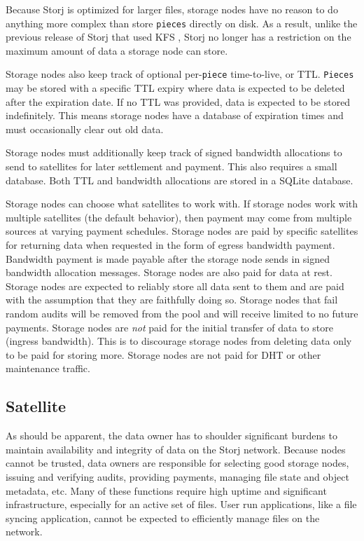 \documentclass[a4paper,10pt]{article} \usepackage[utf8]{inputenc}
\newcommand{\x}[1]{{\tt #1}} \newcommand{\code}[1]{{\tt #1}}
\begin{document}
Because Storj is optimized for larger files, storage nodes have no reason to do
anything more complex than store \x{pieces} directly on disk. As a result,
unlike the previous release of Storj that used KFS \cite{storj-v2}, Storj no
longer has a restriction on the maximum amount of data a storage node can store.

Storage nodes also keep track of optional per-\x{piece} time-to-live, or TTL.
\x{Pieces} may be stored with a specific TTL expiry where data is expected to
be deleted after the expiration date. If no TTL was provided, data is expected
to be stored indefinitely. This means storage nodes have a database of 
expiration
times and must occasionally clear out old data.

Storage nodes must additionally keep track of signed bandwidth allocations to 
send to
satellites for later settlement and payment. This also requires a small
database. Both TTL and bandwidth allocations are stored in a SQLite
\cite{sqlite} database.

Storage nodes can choose what satellites to work with. If storage nodes work 
with
multiple satellites (the default behavior), then payment may come from
multiple sources at varying payment schedules.
Storage nodes are paid by specific satellites for returning data when 
requested in
the form of egress bandwidth payment. Bandwidth payment is made payable after
the storage node sends in signed bandwidth allocation messages.
Storage nodes are also paid for data at rest.
Storage nodes are expected to reliably store all data sent to them and are 
paid
with the assumption that they are faithfully doing so.
Storage nodes that fail random audits will be removed from the pool and will 
receive
limited to no future payments.
Storage nodes are {\em not} paid for the initial transfer of data to store 
(ingress
bandwidth). This is to discourage storage nodes from deleting data only to be 
paid for
storing more. Storage nodes are not paid for DHT or other maintenance traffic.

\subsection{Satellite}

As should be apparent, the data owner has to shoulder significant burdens
to maintain availability and integrity of data on the Storj network. Because
nodes cannot be trusted, data owners are responsible for selecting good
storage nodes, issuing and verifying audits, providing payments, managing file 
state
and object metadata, etc. Many of these functions require high uptime and
significant infrastructure, especially for an active set of files. User run
applications, like a file syncing application, cannot be expected to efficiently
manage files on the network.
\end{document}
